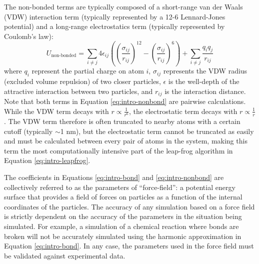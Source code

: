 The non-bonded terms are typically composed of a short-range van der Waals (VDW) interaction term (typically represented by a 12-6 Lennard-Jones potential) and a long-range electrostatics term (typically represented by Coulomb's law): 
\begin{equation}
    U_\text{non-bonded} = \sum_{i \ne j} 4 \epsilon_{ij} \left ( \left (\frac{\sigma_{ij}}{r_{ij}} \right )^{12} - \left (\frac{\sigma_{ij}}{r_{ij}} \right )^6 \right ) + \sum_{i \ne j} \frac{q_i q_j}{r_{ij}}
    \label{eq:intro-nonbond}
\end{equation}
where $q_i$ represent the partial charge on atom $i$, $\sigma_{ij}$ represents the VDW radius (excluded volume repulsion) of two closer particles, $\epsilon$ is the well-depth of the attractive interaction between two particles, and $r_{ij}$ is the interaction distance. 
Note that both terms in Equation \ref{eq:intro-nonbond} are pairwise calculations. 
While the VDW term decays with $r \propto \frac{1}{r^6}$, the electrostatic term decays with $r \propto \frac{1}{r}$. 
The VDW term therefore is often truncated to nearby atoms with a certain cutoff (typically $\sim$1 nm), but the electrostatic term cannot be truncated as easily and must be calculated between every pair of atoms in the system, making this term the most computationally intensive part of the leap-frog algorithm in Equation \ref{eq:intro-leapfrog}. 

The coefficients in Equations \ref{eq:intro-bond} and \ref{eq:intro-nonbond} are collectively referred to as the parameters of ``force-field'': a potential energy surface that provides a field of forces on particles as a function of the internal coordinates of the particles. 
The accuracy of any simulation based on a force field is strictly dependent on the accuracy of the parameters in the situation being simulated. 
For example, a simulation of a chemical reaction where bonds are broken will not be accurately simulated using the harmonic approximation in Equation \ref{eq:intro-bond}. 
In any case, the parameters used in the force field must be validated against experimental data. 

